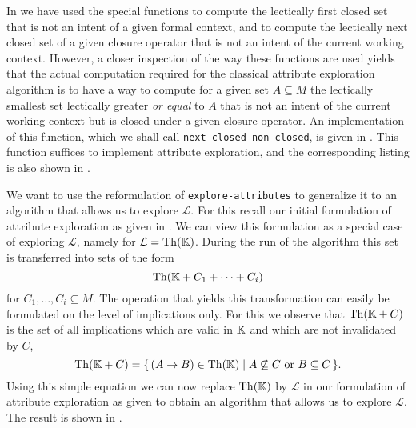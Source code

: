In  we have used the special functions to compute the
lectically first closed set that is not an intent of a given formal context, and to
compute the lectically next closed set of a given closure operator that is not an intent
of the current working context.  However, a closer inspection of the way these functions
are used yields that the actual computation required for the classical attribute
exploration algorithm is to have a way to compute for a given set $A \subseteq M$ the
lectically smallest set lectically greater \emph{or equal} to $A$ that is not an intent of
the current working context but is closed under a given closure operator.  An
implementation of this function, which we shall call \lstinline{next-closed-non-closed},
is given in .  This function
suffices to implement attribute exploration, and the corresponding listing is also shown
in .

We want to use the reformulation of \lstinline{explore-attributes} to generalize it to an
algorithm that allows us to explore $\mathcal{L}$.  For this recall our initial
formulation of attribute exploration as given in .  We can view
this formulation as a special case of exploring $\mathcal{L}$, namely for $\mathcal{L} =
\operatorname{Th}({\mathbb{K}})$.  During the run of the algorithm this set is transferred into sets of the
form
\begin{equation*}
  \operatorname{Th}({\mathbb{K}} + C_1 + \dots + C_i)
\end{equation*}
for $C_1, \dots, C_i \subseteq M$.  The operation that yields this transformation can
easily be formulated on the level of implications only.  For this we observe that
$\operatorname{Th}({\mathbb{K}} + C)$ is the set of all implications which are valid in ${\mathbb{K}}$ and which are
not invalidated by $C$, \ie
\begin{equation}
  \label{eq:35}
  \operatorname{Th}({\mathbb{K}} + C) = {\{\, (A \to B) \in \operatorname{Th}({\mathbb{K}}) \mid A \not\subseteq C \text{ or } B
    \subseteq C \,\}}.
\end{equation}
Using this simple equation we can now replace $\operatorname{Th}({\mathbb{K}})$ by $\mathcal{L}$ in our
formulation of attribute exploration as given
 to obtain an algorithm that
allows us to explore $\mathcal{L}$.  The result is shown in
.


